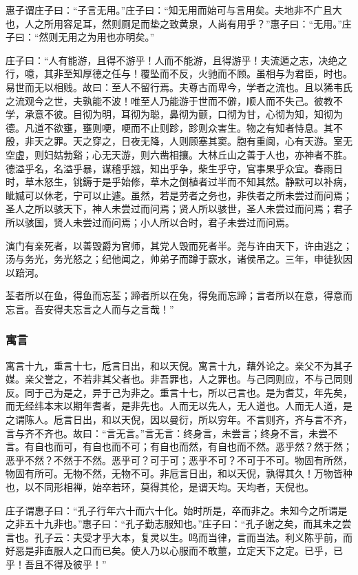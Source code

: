 \documentclass[]{article}
\begin{document}
惠子谓庄子曰：``子言无用。''庄子曰：``知无用而始可与言用矣。夫地非不广且大也，人之所用容足耳，然则厕足而垫之致黄泉，人尚有用乎？''惠子曰：``无用。''庄子曰：``然则无用之为用也亦明矣。''

庄子曰：``人有能游，且得不游乎！人而不能游，且得游乎！夫流遁之志，决绝之行，噫，其非至知厚德之任与！覆坠而不反，火驰而不顾。虽相与为君臣，时也。易世而无以相贱。故曰：至人不留行焉。夫尊古而卑今，学者之流也。且以狶韦氏之流观今之世，夫孰能不波！唯至人乃能游于世而不僻，顺人而不失己。彼教不学，承意不彼。目彻为明，耳彻为聪，鼻彻为颤，口彻为甘，心彻为知，知彻为德。凡道不欲壅，壅则哽，哽而不止则跈，跈则众害生。物之有知者恃息。其不殷，非天之罪。天之穿之，日夜无降，人则顾塞其窦。胞有重阆，心有天游。室无空虚，则妇姑勃谿；心无天游，则六凿相攘。大林丘山之善于人也，亦神者不胜。德溢乎名，名溢乎暴，谋稽乎誸，知出乎争，柴生乎守，官事果乎众宜。春雨日时，草木怒生，铫鎒于是乎始修，草木之倒植者过半而不知其然。静默可以补病，眦媙可以休老，宁可以止遽。虽然，若是劳者之务也，非佚者之所未尝过而问焉；圣人之所以骇天下，神人未尝过而问焉；贤人所以骇世，圣人未尝过而问焉；君子所以骇国，贤人未尝过而问焉；小人所以合时，君子未尝过而问焉。

演门有亲死者，以善毁爵为官师，其党人毁而死者半。尧与许由天下，许由逃之；汤与务光，务光怒之；纪他闻之，帅弟子而蹲于窾水，诸侯吊之。三年，申徒狄因以踣河。

荃者所以在鱼，得鱼而忘荃；蹄者所以在兔，得兔而忘蹄；言者所以在意，得意而忘言。吾安得夫忘言之人而与之言哉！''

\hypertarget{header-n442}{%
\subsubsection{寓言}\label{header-n442}}

寓言十九，重言十七，卮言日出，和以天倪。寓言十九，藉外论之。亲父不为其子媒。亲父誉之，不若非其父者也。非吾罪也，人之罪也。与己同则应，不与己同则反。同于己为是之，异于己为非之。重言十七，所以己言也。是为耆艾，年先矣，而无经纬本末以期年耆者，是非先也。人而无以先人，无人道也。人而无人道，是之谓陈人。卮言日出，和以天倪，因以曼衍，所以穷年。不言则齐，齐与言不齐，言与齐不齐也。故曰：``言无言。''言无言：终身言，未尝言；终身不言，未尝不言。有自也而可，有自也而不可；有自也而然，有自也而不然。恶乎然？然于然；恶乎不然？不然于不然。恶乎可？可于可；恶乎不可？不可于不可。物固有所然，物固有所可。无物不然，无物不可。非卮言日出，和以天倪，孰得其久！万物皆种也，以不同形相禅，始卒若环，莫得其伦，是谓天均。天均者，天倪也。

庄子谓惠子曰：``孔子行年六十而六十化。始时所是，卒而非之。未知今之所谓是之非五十九非也。''惠子曰：``孔子勤志服知也。''庄子曰：``孔子谢之矣，而其未之尝言也。孔子云：夫受才乎大本，复灵以生。鸣而当律，言而当法。利义陈乎前，而好恶是非直服人之口而已矣。使人乃以心服而不敢蘁，立定天下之定。已乎，已乎！吾且不得及彼乎！''
\end{document}
